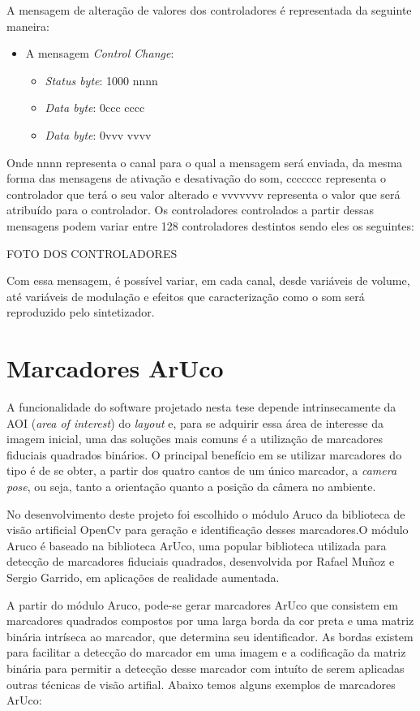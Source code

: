 \documentclass[12pt]{report}
\begin{document}
A mensagem de alteração de valores dos controladores é representada da seguinte maneira:
\begin{itemize}
  \item A mensagem {\it Control Change}:
  \begin{itemize}
    \item {\it Status byte}: 1000 nnnn
    \item {\it Data byte}: 0ccc cccc
    \item {\it Data byte}: 0vvv vvvv
  \end{itemize}
\end{itemize}

Onde nnnn representa o canal para o qual a mensagem será enviada, da mesma forma das mensagens de ativação e desativação do som, ccccccc representa o controlador que terá o seu valor alterado e vvvvvvv representa o valor que será atribuído para o controlador. Os controladores controlados a partir dessas mensagens podem variar entre 128 controladores destintos sendo eles os seguintes:

FOTO DOS CONTROLADORES

Com essa mensagem, é possível variar, em cada canal, desde variáveis de volume, até variáveis de modulação e efeitos que caracterização como o som será reproduzido pelo sintetizador.

\chapter{Marcadores ArUco}
\label{cha:fund-teor}

A funcionalidade do software projetado nesta tese depende intrinsecamente da AOI ({\it area of interest}) do {\it layout} e, para se adquirir essa área de interesse da imagem inicial, uma das soluções mais comuns é a utilização de marcadores fiduciais quadrados binários. O principal benefício em se utilizar marcadores do tipo é de se obter, a partir dos quatro cantos de um único marcador, a {\it camera pose}, ou seja, tanto a orientação quanto a posição da câmera no ambiente.

No desenvolvimento deste projeto foi escolhido o módulo Aruco da biblioteca de visão artificial OpenCv para geração e identificação desses marcadores.O módulo Aruco é baseado na biblioteca ArUco, uma popular biblioteca utilizada para detecção de marcadores fiduciais quadrados, desenvolvida por Rafael Muñoz e Sergio Garrido, em aplicações de realidade aumentada.

A partir do módulo Aruco, pode-se gerar marcadores ArUco que consistem em marcadores quadrados compostos por uma larga borda da cor preta e uma matriz binária intríseca ao marcador, que determina seu identificador. As bordas existem para facilitar a detecção do marcador em uma imagem e a codificação da matriz binária para permitir a detecção desse marcador com intuíto de serem aplicadas outras técnicas de visão artifial. Abaixo temos alguns exemplos de marcadores ArUco:
\end{document}
